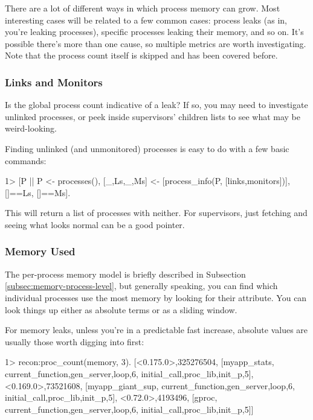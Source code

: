 \documentclass[11pt, oneside]{book}   	%
\begin{document}
There are a lot of different ways in which process memory can grow. Most interesting cases will be related to a few common cases: process leaks (as in, you're leaking processes), specific processes leaking their memory, and so on. It's possible there's more than one cause, so multiple metrics are worth investigating. Note that the process count itself is skipped and has been covered before.

\subsubsection{Links and Monitors}

Is the global process count indicative of a leak? If so, you may need to investigate unlinked processes, or peek inside supervisors' children lists to see what may be weird-looking.

Finding unlinked (and unmonitored) processes is easy to do with a few basic commands:

\begin{VerbatimEshell}
1> [P || P <- processes(),
         [{_,Ls},{_,Ms}] <- [process_info(P, [links,monitors])],
         []==Ls, []==Ms].
\end{VerbatimEshell}

This will return a list of processes with neither. For supervisors, just fetching \newline {} and seeing what looks normal can be a good pointer.


\subsubsection{Memory Used}

The per-process memory model is briefly described in Subsection \ref{subsec:memory-process-level}, but generally speaking, you can find which individual processes use the most memory by looking for their  attribute. You can look things up either as absolute terms or as a sliding window.

For memory leaks, unless you're in a predictable fast increase, absolute values are usually those worth digging into first:

\begin{VerbatimEshell}
1> recon:proc_count(memory, 3).
[{<0.175.0>,325276504,
  [myapp_stats,
   {current_function,{gen_server,loop,6}},
   {initial_call,{proc_lib,init_p,5}}]},
 {<0.169.0>,73521608,
  [myapp_giant_sup,
   {current_function,{gen_server,loop,6}},
   {initial_call,{proc_lib,init_p,5}}]},
 {<0.72.0>,4193496,
  [gproc,
   {current_function,{gen_server,loop,6}},
   {initial_call,{proc_lib,init_p,5}}]}]
\end{VerbatimEshell}
\end{document}
